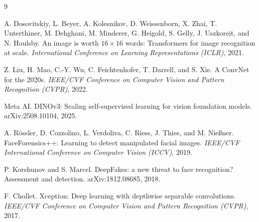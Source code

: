 \documentclass[11pt,a4paper]{article}
\begin{document}

\begin{thebibliography}{9}

A. Dosovitskiy, L. Beyer, A. Kolesnikov, D. Weissenborn, X. Zhai, T. Unterthiner,
M. Dehghani, M. Minderer, G. Heigold, S. Gelly, J. Uszkoreit, and N. Houlsby.
An image is worth $16\times16$ words: Transformers for image recognition at scale.
\emph{International Conference on Learning Representations (ICLR)}, 2021.

Z. Liu, H. Mao, C.-Y. Wu, C. Feichtenhofer, T. Darrell, and S. Xie.
A ConvNet for the 2020s.
\emph{IEEE/CVF Conference on Computer Vision and Pattern Recognition (CVPR)}, 2022.

Meta AI. DINOv3: Scaling self-supervised learning for vision foundation models.
arXiv:2508.10104, 2025.

A. R\"ossler, D. Cozzolino, L. Verdoliva, C. Riess, J. Thies, and M. Nie{\ss}ner.
FaceForensics++: Learning to detect manipulated facial images.
\emph{IEEE/CVF International Conference on Computer Vision (ICCV)}, 2019.

P. Korshunov and S. Marcel.
DeepFakes: a new threat to face recognition? Assessment and detection.
arXiv:1812.08685, 2018.

F. Chollet.
Xception: Deep learning with depthwise separable convolutions.
\emph{IEEE/CVF Conference on Computer Vision and Pattern Recognition (CVPR)}, 2017.

\end{thebibliography}
\end{document}
